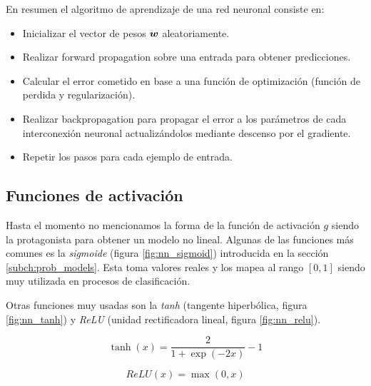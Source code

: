 En resumen el algoritmo de aprendizaje de una red neuronal consiste en:

\begin{itemize}
    \item Inicializar el vector de pesos $\boldsymbol{w}$ aleatoriamente.
    \item Realizar forward propagation sobre una entrada para obtener
    predicciones.
    \item Calcular el error cometido en base a una función de optimización
    (función de perdida y regularización).
    \item Realizar backpropagation para propagar el error a los parámetros de
    cada interconexión neuronal actualizándolos mediante descenso por el
    gradiente.
    \item Repetir los pasos para cada ejemplo de entrada.
\end{itemize}

\subsection{Funciones de activación}

Hasta el momento no mencionamos la forma de la función de activación $g$ siendo
la protagonista para obtener un modelo no lineal. Algunas de las funciones más
comunes es la \emph{sigmoide} (figura \ref{fig:nn_sigmoid}) introducida en la
sección \ref{subch:prob_models}. Esta toma valores reales y los mapea al rango
$[0, 1]$ siendo muy utilizada en procesos de clasificación.

Otras funciones muy usadas son la \emph{tanh} (tangente hiperbólica, figura
\ref{fig:nn_tanh}) y \emph{ReLU} (unidad rectificadora lineal, figura
\ref{fig:nn_relu}).

\begin{equation}
    \tanh\left( x \right) = \frac{2}{1 + \exp(-2x)} - 1
\end{equation}

\begin{equation}
    ReLU\left( x \right) = \max(0, x)
\end{equation}

